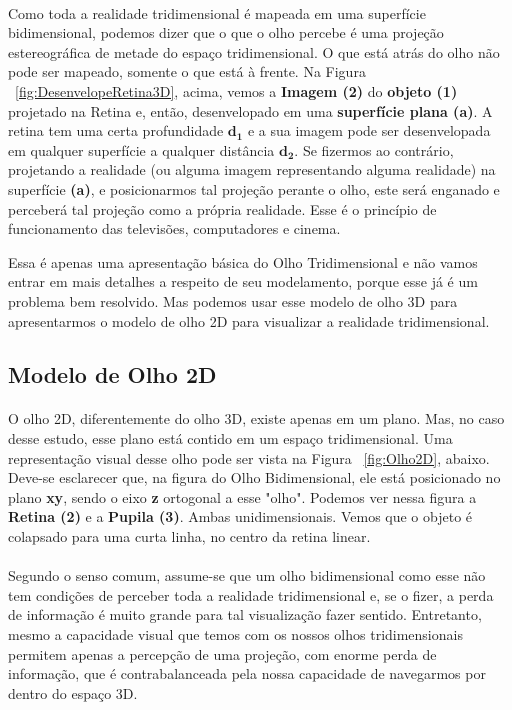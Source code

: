 \documentclass{article}
\begin{document}
	\paragraph{}
	Como toda a realidade tridimensional é mapeada em uma superfície bidimensional, podemos dizer que o que o olho percebe é uma projeção estereográfica de metade do espaço tridimensional. O que está atrás do olho não pode ser mapeado, somente o que está à frente. Na Figura ~\ref{fig:DesenvelopeRetina3D}, acima, vemos a \textbf{Imagem (2)} do \textbf{objeto (1)} projetado na Retina e, então, desenvelopado em uma \textbf{superfície plana (a)}. A retina tem uma certa profundidade $\boldsymbol{d_1}$ e a sua imagem pode ser desenvelopada em qualquer superfície a qualquer distância $\boldsymbol{d_2}$. Se fizermos ao contrário, projetando a realidade (ou alguma imagem representando alguma realidade) na superfície \textbf{(a)}, e posicionarmos tal projeção perante o olho, este será enganado e perceberá tal projeção como a própria realidade. Esse é o princípio de funcionamento das televisões, computadores e cinema.
	
	Essa é apenas uma apresentação básica do Olho Tridimensional e não vamos entrar em mais detalhes a respeito de seu modelamento, porque esse já é um problema bem resolvido. Mas podemos usar esse modelo de olho 3D para apresentarmos o modelo de olho 2D para visualizar a realidade tridimensional.
	 
	\subsection{Modelo de Olho 2D} \label{mo2d}
	
	\paragraph{}
	O olho 2D, diferentemente do olho 3D, existe apenas em um plano. Mas, no caso desse estudo, esse plano está contido em um espaço tridimensional. Uma representação visual desse olho pode ser vista na Figura ~\ref{fig:Olho2D}, abaixo. Deve-se esclarecer que, na figura do Olho Bidimensional, ele está posicionado no plano \textbf{xy}, sendo o eixo \textbf{z} ortogonal a esse "olho". Podemos ver nessa figura a \textbf{Retina (2)} e a \textbf{Pupila (3)}. Ambas unidimensionais. Vemos que o objeto é colapsado para uma curta linha, no centro da retina linear.
	
	\paragraph{}
	Segundo o senso comum, assume-se que um olho bidimensional como esse não tem condições de perceber toda a realidade tridimensional e, se o fizer, a perda de informação é muito grande para tal visualização fazer sentido. Entretanto, mesmo a capacidade visual que temos com os nossos olhos tridimensionais permitem apenas a percepção de uma projeção, com enorme perda de informação, que é contrabalanceada pela nossa capacidade de navegarmos por dentro do espaço 3D.
	
\end{document}

